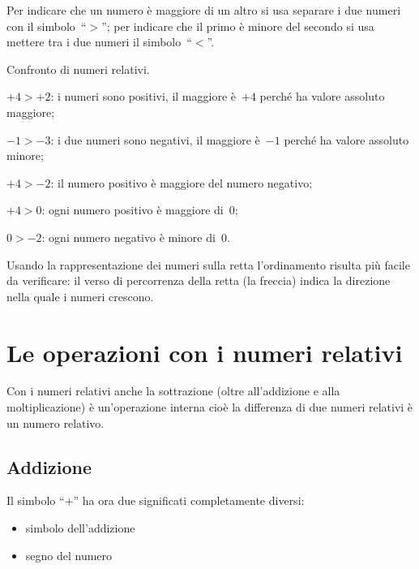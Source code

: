 Per indicare che un numero è maggiore di un altro si usa separare i due 
numeri 
con il
simbolo~``\(>\)''; per indicare che il primo è minore del secondo si usa 
mettere 
tra i due numeri il simbolo~``\(<\)''.

 \begin{esempio}
 Confronto di numeri relativi.
 \begin{itemize*}
 \item \(+4>+2\): i numeri sono positivi, il maggiore è~\(+4\) perché ha 
valore 
assoluto maggiore;
 \item \(-1>-3\): i due numeri sono negativi, il maggiore è~\(-1\) perché 
ha valore 
assoluto minore;
 \item \(+4>-2\): il numero positivo è maggiore del numero negativo;
 \item \(+4>0\): ogni numero positivo è maggiore di~0;
 \item \(0>-2\): ogni numero negativo è minore di~0.
 \end{itemize*}
 \end{esempio}

Usando la rappresentazione dei numeri sulla retta l'ordinamento risulta più 
facile da verificare:
il verso di percorrenza della retta (la freccia) indica la direzione nella 
quale 
i numeri crescono.


\section{Le operazioni con i numeri relativi}
\label{sec:02_operazioni}

Con i numeri relativi anche la sottrazione (oltre all'addizione e alla 
moltiplicazione) è un'operazione interna cioè la differenza di due numeri 
relativi è un numero relativo.

\subsection{Addizione}

Il simbolo ``\(+\)'' ha ora due significati completamente diversi:
\begin{multicols}{2}
\begin{itemize} [nosep]
\item simbolo dell'addizione
\item segno del numero
\end{itemize}
\end{multicols}

